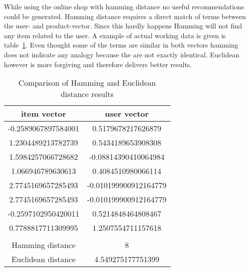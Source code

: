While using the online shop with hamming distance no useful recommendations could be generated.
Hamming distance requires a direct match of terms between the user- and product-vector.
Since this hardly happens Hamming will not find any item related to the user.
A example of actual working data is given is table~\ref{tab:hamming-vs-euclidean}.
Even thought some of the terms are similar in both vectors hamming does not indicate any analogy because the are not exactly identical.
Euclidean however is more forgiving and therefore delivers better results.

\begin{table}

    \center

    \begin{tabular}{ c | c }
        \rowcolor{\dustRowHead}
        item vector         & user vector\\\hline
        -0.2589067897584001 & 0.5179678217626879\\
        1.2304489213782739  & 0.5434189653908308\\
        1.5984257066728682  & -0.08814390410064984\\
        1.066946789630613   & 0.4084510980066114\\
        2.7745169657285493  & -0.010199900912164779\\
        2.7745169657285493  & -0.010199900912164779\\
        -0.2597102950420011 & 0.5214848464808467\\
        0.7788817711309995  & 1.2507554711157618\\
        \hline
        \rowcolor{\dustRowHead}
        \multicolumn{2}{ c }{resulting distance}\\
        \hline
        Hamming distance    & 8\\
        Euclidean distance  & 4.549275177751399\\
    \end{tabular}

    \caption{Comparison of Hamming and Euclidean distance results}
    \label{tab:hamming-vs-euclidean}
\end{table}




